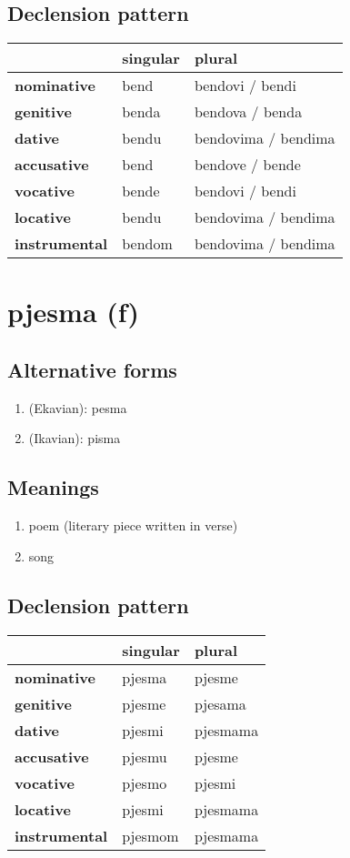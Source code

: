 \subsection*{Declension pattern}
\begin{tabularx}{\linewidth}{Xll}
\toprule
{} & singular &               plural \\
\midrule
\textbf{nominative  } &     bend &      bendovi / bendi \\
\textbf{genitive    } &    benda &      bendova / benda \\
\textbf{dative      } &    bendu &  bendovima / bendima \\
\textbf{accusative  } &     bend &      bendove / bende \\
\textbf{vocative    } &    bende &      bendovi / bendi \\
\textbf{locative    } &    bendu &  bendovima / bendima \\
\textbf{instrumental} &   bendom &  bendovima / bendima \\
\bottomrule
\end{tabularx}

\filbreak
\section{pjesma (f)}
\subsection*{Alternative forms}
\begin{enumerate}
\item (Ekavian): pesma
\item (Ikavian): pisma
\end{enumerate}
\subsection*{Meanings}
\begin{enumerate}
\item poem (literary piece written in verse)
\item song
\end{enumerate}
\subsection*{Declension pattern}
\begin{tabularx}{\linewidth}{Xll}
\toprule
{} & singular &    plural \\
\midrule
\textbf{nominative  } &   pjesma &    pjesme \\
\textbf{genitive    } &   pjesme &   pjesama \\
\textbf{dative      } &   pjesmi &  pjesmama \\
\textbf{accusative  } &   pjesmu &    pjesme \\
\textbf{vocative    } &   pjesmo &    pjesmi \\
\textbf{locative    } &   pjesmi &  pjesmama \\
\textbf{instrumental} &  pjesmom &  pjesmama \\
\bottomrule
\end{tabularx}

